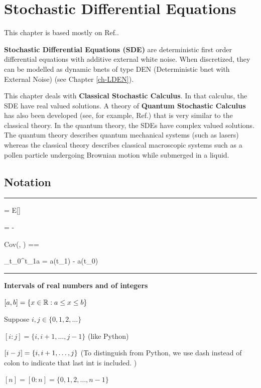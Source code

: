 \chapter{Stochastic Differential Equations}
\label{ch-stochastic-diff-eqns}

This chapter is based mostly on Ref.\cite{sar-sol}.

{\bf Stochastic Differential Equations (SDE)}
are deterministic first order differential equations with additive external white noise. When discretized, they
can be modelled as dynamic bnets of type
DEN (Deterministic bnet with External Noise) (see Chapter \ref{ch-LDEN}).

This chapter deals with {\bf Classical Stochastic Calculus}. In that calculus,
the SDE have real valued solutions.
A theory of {\bf Quantum Stochastic Calculus} has also been developed (see,
for example,  Ref.\cite{part-quantum-sde}) that is
very similar to the classical
theory. In the quantum theory, the SDEs  have complex valued solutions. The quantum theory describes quantum
mechanical systems (such as lasers)
whereas the classical theory describes classical macroscopic systems such as a
pollen particle undergoing Brownian motion
while submerged in a liquid.


\section{Notation}

\hrule{}

\beq
\av{\rva} = E[\rva]
\eeq

\beq
\Delta \rva = \rva - \av{\rva}
\eeq

\beq
Cov(\rva, \rvb) =\av{\rva, \rvb}=
\av{\Delta\rva \Delta\rvb}
\eeq

\beq
\Delta_{t_0}^{t_1}a = a(t_1) - a(t_0)
\eeq

\hrule \noindent
{\bf Intervals of real numbers and of integers}

$[a, b]=\{ x\in { \mathbb{R}}: a\leq x \leq b\}$

Suppose $i, j\in \{0, 1,2, \ldots\}$

$[i:j] =\{i, i+1, \ldots, j-1\}$  (like Python)

$[i - j] = \{i, i+1, \ldots, j\}$ (To distinguish from Python,
we use dash instead of colon
to indicate that last int is included.
)




$[n]=[0:n]=\{0, 1, 2, \ldots, n-1\}$


